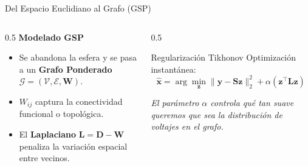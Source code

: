 \documentclass[10pt, aspectratio=169]{beamer}
\begin{document}
\begin{frame}{Del Espacio Euclidiano al Grafo (GSP)}
    \begin{columns}
        \begin{column}{0.5\textwidth}
            \textbf{Modelado GSP}
            \begin{itemize}
                \item Se abandona la esfera y se pasa a un \textbf{Grafo Ponderado} $\mathcal{G} = (\mathcal{V}, \mathcal{E}, \mathbf{W})$.
                \item $W_{ij}$ captura la conectividad funcional o topológica.
                \item El \textbf{Laplaciano} $\mathbf{L} = \mathbf{D} - \mathbf{W}$ penaliza la variación espacial entre vecinos.
            \end{itemize}
        \end{column}
        \begin{column}{0.5\textwidth}
            \begin{block}{Regularización Tikhonov}
                Optimización instantánea:
                \[ \hat{\mathbf{x}} = \arg\min_{\mathbf{z}} \| \mathbf{y} - \mathbf{S} \mathbf{z} \|_2^2 + \alpha (\mathbf{z}^\top \mathbf{L} \mathbf{z}) \]
            \end{block}
            \textit{El parámetro $\alpha$ controla qué tan suave queremos que sea la distribución de voltajes en el grafo.}
        \end{column}
    \end{columns}
\end{frame}
\end{document}
